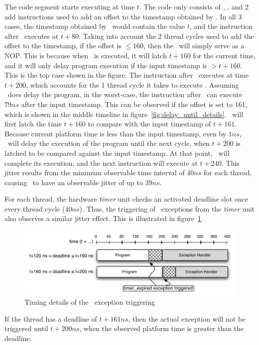 The code segment starts executing at time $t$. 
The code only consists of \gettime, \delayuntil, and 2 add instructions used to add an offset to the timestamp obtained by \gettime.
In all 3 cases, the timestamp obtained by \gettime\ would contain the value $t$, and the instruction after \gettime\ executes at $t+80$.
Taking into account the 2 thread cycles used to add the offset to the timestamp, if the offset is $\leq 160$, then the \delayuntil\ will simply serve as a NOP. 
This is because when \delayuntil\ is executed, it will latch $t+160$ for the current time, and it will only delay program execution if the input timestamp is $> t+160$.
This is the top case shown in the figure.
The instruction after \delayuntil\ executes at time $t+200$, which accounts for the 1 thread cycle it takes to execute \delayuntil.
Assuming \delayuntil\ does delay the program, in the worst-case, the instruction after \delayuntil\ can execute $79 ns$ after the input timestamp. 
This can be observed if the offset is set to 161, which is shown in the middle timeline in figure~\ref{fig:delay_until_details}.  
\Delayuntil\ will first latch the time $t+160$ to compare with the input timestamp of $t+161$. 
Because current platform time is less than the input timestamp, even by $1ns$, \delayuntil\ will delay the execution of the program until the next cycle, when $t+200$ is latched to be compared against the input timestamp. 
At that point, \delayuntil\ will complete its execution, and the next instruction will execute at $t+240$.
This jitter results from the minimum observable time interval of $40 ns$ for each thread, causing \delayuntil\ to have an observable jitter of up to $39 ns$. 

For each thread, the hardware \emph{timer} unit checks an activated deadline slot once every thread cycle ($40ns$). 
Thus, the triggering of \timerexpired\ exceptions from the \emph{timer} unit also observes a similar jitter effect. 
This is illustrated in figure~\ref{fig:timing_exception_details}.  
\begin{figure}[h]
  \begin{center}
    \includegraphics[scale=.7]{figs/timing_exception_details}
  \end{center}
  \vspace{-3mm}
  \caption{Timing details of the \timerexpired\ exception triggering}
  \label{fig:timing_exception_details}
\end{figure}
If the thread has a deadline of $t+161ns$, then the actual exception will not be triggered until $t+200ns$, when the observed platform time is greater than the deadline. 

